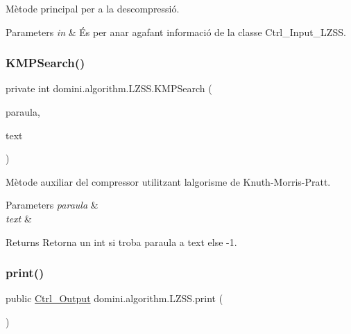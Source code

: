 Mètode principal per a la descompressió. 


\begin{DoxyParams}{Parameters}
{\em in} & És per anar agafant informació de la classe Ctrl\+\_\+\+Input\+\_\+\+L\+Z\+SS. \\
\hline
\end{DoxyParams}
\mbox{\label{classdomini_1_1algorithm_1_1LZSS_a88e88f2bb6e984cadf48e1c71f0234fc}} 
\subsubsection{\texorpdfstring{K\+M\+P\+Search()}{KMPSearch()}}
{\footnotesize\ttfamily private int domini.\+algorithm.\+L\+Z\+S\+S.\+K\+M\+P\+Search (\begin{DoxyParamCaption}\item[{Array\+List$<$ Byte $>$}]{paraula,  }\item[{\hyperlink{classdomini_1_1utils_1_1ArrayCircular}{Array\+Circular}}]{text }\end{DoxyParamCaption})\hspace{0.3cm}{\ttfamily [inline]}}



Mètode auxiliar del compressor utilitzant l\textquotesingle{}algorisme de Knuth-\/\+Morris-\/\+Pratt. 


\begin{DoxyParams}{Parameters}
{\em paraula} & \\
\hline
{\em text} & \\
\hline
\end{DoxyParams}
\begin{DoxyReturn}{Returns}
Retorna un int si troba paraula a text else -\/1. 
\end{DoxyReturn}
\mbox{\label{classdomini_1_1algorithm_1_1LZSS_a8172ff7c8aefb87c90c648bc1b6b78b9}} 
\subsubsection{\texorpdfstring{print()}{print()}}
{\footnotesize\ttfamily public \hyperlink{classpersistencia_1_1output_1_1Ctrl__Output}{Ctrl\+\_\+\+Output} domini.\+algorithm.\+L\+Z\+S\+S.\+print (\begin{DoxyParamCaption}{ }\end{DoxyParamCaption})\hspace{0.3cm}{\ttfamily [inline]}}



